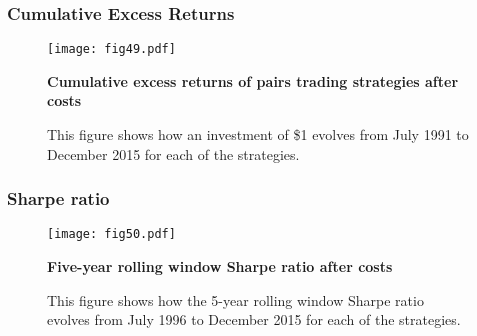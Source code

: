 \documentclass[pdf,9pt,xcolor=dvipsnames,hide notes]{beamer}
\begin{document}
%		
%
%
%
%
%
%
%
%
\begin{frame}[label=frame5a]
	\frametitle{Cumulative Excess Returns}

\begin{figure}[H]
	\centering
	\texttt{[image: fig49.pdf]}
	\caption{\textbf{Cumulative excess returns of pairs trading strategies after costs}}
	\caption*{\tiny This figure shows how an investment of \$1 evolves from July 1991 to December 2015 for each of the strategies.}
	\label{fig:fig49}
\end{figure}

\end{frame}
%
%
\begin{frame}[label=frame5b]
	\frametitle{Sharpe ratio}

\begin{figure}[H]
	\centering
	\texttt{[image: fig50.pdf]}
	\caption{\textbf{Five-year rolling window Sharpe ratio after costs}}
	\caption*{This figure shows how the 5-year rolling window Sharpe ratio evolves from July 1996 to December 2015 for each of the strategies.}
	\label{fig:fig50}
\end{figure}

\end{frame}
\end{document}

